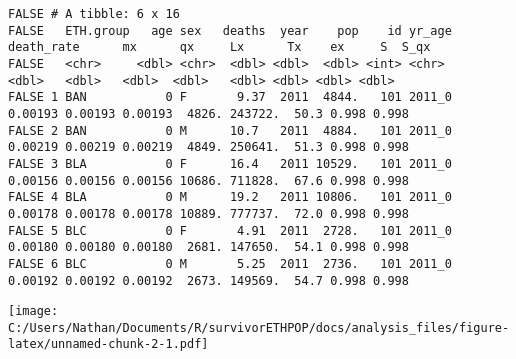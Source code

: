 \documentclass[
]{article}
\newenvironment{Shaded}{\begin{snugshade}}{\end{snugshade}}
\newcommand{\DataTypeTok}[1]{\textcolor[rgb]{0.13,0.29,0.53}{#1}}
\newcommand{\DecValTok}[1]{\textcolor[rgb]{0.00,0.00,0.81}{#1}}
\newcommand{\KeywordTok}[1]{\textcolor[rgb]{0.13,0.29,0.53}{\textbf{#1}}}
\newcommand{\NormalTok}[1]{#1}
\newcommand{\OperatorTok}[1]{\textcolor[rgb]{0.81,0.36,0.00}{\textbf{#1}}}
\newcommand{\OtherTok}[1]{\textcolor[rgb]{0.56,0.35,0.01}{#1}}
\newcommand{\StringTok}[1]{\textcolor[rgb]{0.31,0.60,0.02}{#1}}
\begin{document}
\begin{verbatim}
FALSE # A tibble: 6 x 16
FALSE   ETH.group   age sex   deaths  year    pop    id yr_age death_rate      mx      qx     Lx      Tx    ex     S  S_qx
FALSE   <chr>     <dbl> <chr>  <dbl> <dbl>  <dbl> <int> <chr>       <dbl>   <dbl>   <dbl>  <dbl>   <dbl> <dbl> <dbl> <dbl>
FALSE 1 BAN           0 F       9.37  2011  4844.   101 2011_0    0.00193 0.00193 0.00193  4826. 243722.  50.3 0.998 0.998
FALSE 2 BAN           0 M      10.7   2011  4884.   101 2011_0    0.00219 0.00219 0.00219  4849. 250641.  51.3 0.998 0.998
FALSE 3 BLA           0 F      16.4   2011 10529.   101 2011_0    0.00156 0.00156 0.00156 10686. 711828.  67.6 0.998 0.998
FALSE 4 BLA           0 M      19.2   2011 10806.   101 2011_0    0.00178 0.00178 0.00178 10889. 777737.  72.0 0.998 0.998
FALSE 5 BLC           0 F       4.91  2011  2728.   101 2011_0    0.00180 0.00180 0.00180  2681. 147650.  54.1 0.998 0.998
FALSE 6 BLC           0 M       5.25  2011  2736.   101 2011_0    0.00192 0.00192 0.00192  2673. 149569.  54.7 0.998 0.998
\end{verbatim}

\begin{Shaded}
\end{Shaded}

\texttt{[image: C:/Users/Nathan/Documents/R/survivorETHPOP/docs/analysis\_files/figure-latex/unnamed-chunk-2-1.pdf]}
\end{document}
